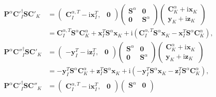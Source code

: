 \documentclass[a4paper,11pt,twoside,openright]{book}
\begin{document}
\begin{align}
  \mathbf{P}^{\alpha}\mathbf{C}'^{\dagger}_{I}\mathbf{S}\mathbf{C}'_{K}
  &=\begin{pmatrix}
    \mathbf{C}^{\alpha,T}_{I}-\text{i}\mathbf{x}^{T}_{I}, & \mathbf{0}
  \end{pmatrix}
  \begin{pmatrix}
    \mathbf{S}^{\alpha} & \mathbf{0}\\
    \mathbf{0} & \mathbf{S}^{\alpha}
  \end{pmatrix}
  \begin{pmatrix}
    \mathbf{C}^{\alpha}_{K}+\text{i}\mathbf{x}_{K}\\
    \mathbf{y}_{K}+\text{i}\mathbf{z}_{K}
  \end{pmatrix}\\
  &=\mathbf{C}^{\alpha,T}_{I}\mathbf{S}^{\alpha}\mathbf{C}^{\alpha}_{K}%
    +\mathbf{x}^{T}_{I}\mathbf{S}^{\alpha}\mathbf{x}_{K}%
    +\text{i}\left(\mathbf{C}^{\alpha,T}_{I}\mathbf{S}^{\alpha}\mathbf{x}_{K}%
    -\mathbf{x}^{T}_{I}\mathbf{S}^{\alpha}\mathbf{C}^{\alpha}_{K}\right),\nonumber\\
%
  \mathbf{P}^{\alpha}\mathbf{C}''^{\dagger}_{I}\mathbf{S}\mathbf{C}'_{K}
  &=\begin{pmatrix}
    -\mathbf{y}^{T}_{I}-\text{i}\mathbf{z}^{T}_{I}, & \mathbf{0}
  \end{pmatrix}
  \begin{pmatrix}
    \mathbf{S}^{\alpha} & \mathbf{0}\\
    \mathbf{0} & \mathbf{S}^{\alpha}
  \end{pmatrix}
  \begin{pmatrix}
    \mathbf{C}^{\alpha}_{K}+\text{i}\mathbf{x}_{K}\\
    \mathbf{y}_{K}+\text{i}\mathbf{z}_{K}
  \end{pmatrix}\\
  &=-\mathbf{y}^{T}_{I}\mathbf{S}^{\alpha}\mathbf{C}^{\alpha}_{K}%
    +\mathbf{z}^{T}_{I}\mathbf{S}^{\alpha}\mathbf{x}_{K}%
    +\text{i}\left(-\mathbf{y}^{T}_{I}\mathbf{S}^{\alpha}\mathbf{x}_{K}%
    -\mathbf{z}^{T}_{I}\mathbf{S}^{\alpha}\mathbf{C}^{\alpha}_{K}\right),\nonumber\\
%
  \mathbf{P}^{\alpha}\mathbf{C}'^{\dagger}_{I}\mathbf{S}\mathbf{C}''_{K}
  &=\begin{pmatrix}
    \mathbf{C}^{\alpha,T}_{I}-\text{i}\mathbf{x}^{T}_{I}, & \mathbf{0}
  \end{pmatrix}
  \begin{pmatrix}
    \mathbf{S}^{\alpha} & \mathbf{0}\\

\end{pmatrix}
\end{align}
\end{document}
